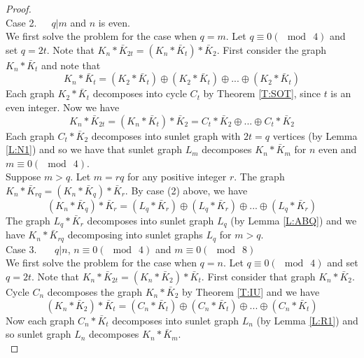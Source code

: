 \documentclass[12pt]{report}
\begin{document}
\begin{proof}
\\
Case 2.\ \ \ $q|m$ and $n$ is even.\\
We first solve the problem  for the case when $q=m$. Let $q\equiv
0(\mod\ 4)$ and set $q=2t$. Note that
$K_n*\bar{K}_{2t}=(K_n*\bar{K}_t)*\bar{K}_2$. First consider the
graph $K_n*\bar{K}_t$ and note that
$$K_n*\bar{K}_t=(K_2*\bar{K}_t)\oplus (K_2*\bar{K}_t)\oplus...\oplus
(K_2*\bar{K}_t)$$ Each graph $K_2*\bar{K}_t$ decomposes into cycle $C_t$
by Theorem \ref{T:SOT}, since $t$ is an even integer. Now we have
$$K_n*\bar{K}_{2t}=(K_n*\bar{K}_t)*\bar{K}_2=C_t*\bar{K}_2\oplus...\oplus
C_t*\bar{K}_2$$
Each graph $C_t*\bar{K}_2$ decomposes into sunlet graph with $2t=q$ vertices (by Lemma \ref{L:N1}) and so we have that sunlet graph $L_m$ decomposes $K_n*\bar{K}_m$ for $n$ even and $m\equiv 0(\mod\ 4)$.\\
Suppose $m>q$. Let $m=rq$ for any positive integer $r$.   The graph
$K_n*\bar{K}_{rq}=(K_n*\bar{K}_q)*\bar{K}_r$. By case (2) above, we
have $$(K_n*\bar{K}_q)*\bar{K}_r=(L_q*\bar{K}_r)\oplus
(L_q*\bar{K}_r)\oplus...\oplus(L_q*\bar{K}_r)$$ The graph
$L_q*\bar{K}_r$ decomposes into sunlet graph $L_q$ (by Lemma
\ref{L:ABQ}) and we have $K_n*\bar{K}_{rq}$ decomposing into sunlet
graphs $L_q$ for $m>q$.
\\
Case 3. \ \ \ $q|n$, $n\equiv 0(\mod\ 4)$ and $m\equiv 0(\mod\ 8)$\\
We first solve the problem  for the case when $q=n$. Let $q\equiv
0(\mod\ 4)$ and set
$q=2t$. Note that %
 $K_n*\bar{K}_{2t}=(K_n*\bar{K}_2)*\bar{K}_t$. First consider that graph $K_n*\bar{K}_2$. Cycle $C_n$ decomposes the graph $K_n*\bar{K}_2$ by Theorem \ref{T:IU} and  we have $$(K_n*\bar{K}_2)*\bar{K}_t=(C_n*\bar{K}_t)\oplus (C_n*\bar{K}_t)\oplus...\oplus (C_n*\bar{K}_t)$$
Now each graph $C_n*\bar{K}_t$ decomposes into sunlet graph $L_n$ (by Lemma \ref{L:R1}) and so sunlet graph $L_n$ decomposes $K_n*\bar{K}_m$.\\

\end{proof}
\end{document}
